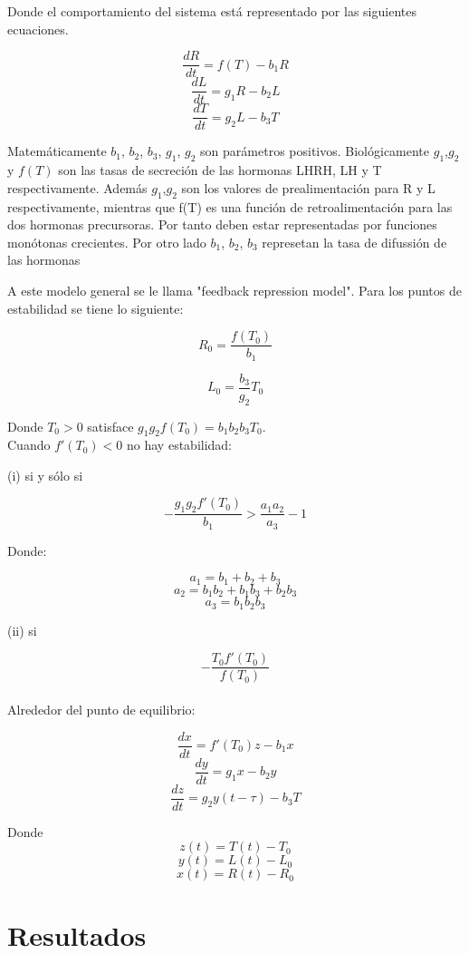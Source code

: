 \documentclass[letter,11pt]{article}
\begin{document}
Donde el comportamiento del sistema está representado por las siguientes ecuaciones.

$$ \frac{dR}{dt} = f(T)-b_{1}R$$
$$ \frac{dL}{dt} = g_{1}R-b_{2}L $$
$$ \frac{dT}{dt} = g_{2}L-b_{3}T $$

Matemáticamente $b_{1}$, $b_{2}$, $b_{3}$, $g_{1}$, $g_{2}$ son parámetros positivos. Biológicamente $g_{1}$,$g_{2}$ y $f(T)$ son las tasas de secreción de las hormonas LHRH, LH y T respectivamente. Además  $g_{1}$,$g_{2}$ son los valores de prealimentación para R y L respectivamente, mientras que f(T) es una función de retroalimentación para las dos hormonas precursoras. Por tanto deben estar representadas por funciones monótonas crecientes. Por otro lado $b_{1}$, $b_{2}$, $b_{3}$ represetan la tasa de difussión de las hormonas

A este modelo general se le llama "feedback repression model". Para los puntos de estabilidad se tiene lo siguiente:

$$R_{0} = \frac{f(T_{0})}{b_{1}}$$

$$L_{0} = \frac{b_{3}}{g_{2}}T_{0}$$

Donde $T_{0}>0$ satisface $g_{1}g_{2}f(T_{0}) = b_{1}b_{2}b_{3}T_{0}.$\\

Cuando $f'(T_{0}) < 0$ no hay estabilidad: 

(i) si y sólo si 

$$-\frac{g_{1}g_{2}f'(T_{0})}{b_{1}} > \frac{a_{1}a_{2}}{a_{3}}-1$$

Donde:

$$a_{1} = b_{1}+b_{2}+b_{3}$$
$$a_{2}=b_{1}b_{2}+b_{1}b_{3}+b_{2}b_{3}$$
$$a_{3}=b_{1}b_{2}b_{3}$$

(ii) si 

$$-\frac{T_{0}f'(T_{0})}{f(T_{0})}$$\\

Alrededor del punto de equilibrio:

$$ \frac{dx}{dt} = f'(T_{0})z-b_{1}x$$
$$ \frac{dy}{dt} = g_{1}x-b_{2}y $$
$$ \frac{dz}{dt} = g_{2}y(t-\tau)-b_{3}T $$

Donde
$$ z(t)=T(t)-T_{0} $$
$$ y(t)=L(t)-L_{0} $$
$$ x(t)=R(t)-R_{0} $$

\section{Resultados}
\end{document}
